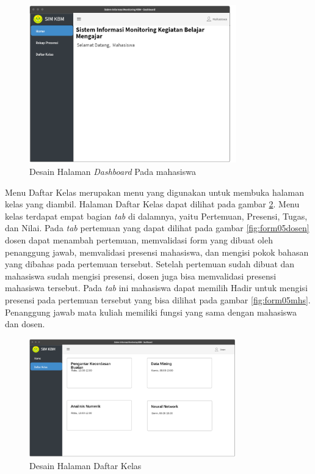 \begin{figure}[h!]
	\centering
	\includegraphics[width=0.8\textwidth]{gambar/mockup/home_mahasiswa}
	\caption{Desain Halaman \textit{Dashboard} Pada mahasiswa}
	\label{fig:dashboard}
\end{figure}


Menu Daftar Kelas merupakan menu yang digunakan untuk membuka halaman kelas yang diambil. Halaman Daftar Kelas dapat dilihat pada gambar \ref{fig:daftarkelas}. Menu kelas terdapat empat bagian \textit{tab} di dalamnya, yaitu Pertemuan, Presensi, Tugas, dan Nilai. Pada \textit{tab} pertemuan yang dapat dilihat pada gambar \ref{fig:form05dosen} dosen dapat menambah pertemuan, memvalidasi form yang dibuat oleh penanggung jawab, memvalidasi presensi mahasiswa, dan mengisi pokok bahasan yang dibahas pada pertemuan tersebut. Setelah pertemuan sudah dibuat dan mahasiswa sudah mengisi presensi, dosen juga bisa memvalidasi presensi mahasiswa tersebut. Pada \textit{tab} ini mahasiswa dapat memilih Hadir untuk mengisi presensi pada pertemuan tersebut yang bisa dilihat pada gambar \ref{fig:form05mhs}. Penanggung jawab mata kuliah memiliki fungsi yang sama dengan mahasiswa dan dosen.

\begin{figure}[h!]
	\centering
	\includegraphics[width=0.8\textwidth]{gambar/mockup/daftar_kelas}
	\caption{Desain Halaman Daftar Kelas}
	\label{fig:daftarkelas}
\end{figure}

